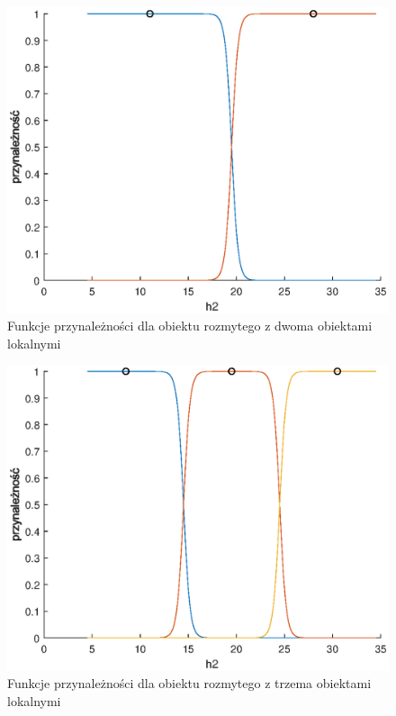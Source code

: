 		\begin{figure}[h!]
			\includegraphics[width=0.9\linewidth]{plots/z2_modelroz_2.eps}
			\caption{Funkcje przynależności dla obiektu rozmytego z dwoma obiektami lokalnymi}
			\label{rys:roz2}
		\end{figure}
		\begin{figure}[h!]
			\includegraphics[width=0.9\linewidth]{plots/z2_modelroz_3.eps}
			\caption{Funkcje przynależności dla obiektu rozmytego z trzema obiektami lokalnymi}
			\label{rys:roz3}
		\end{figure}
